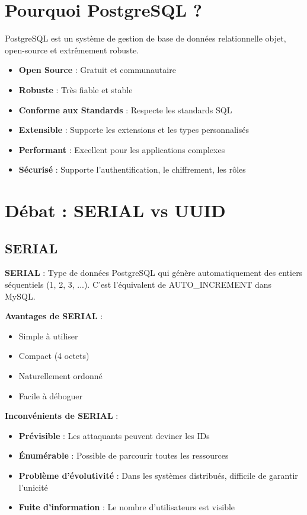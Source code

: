 \section{Pourquoi PostgreSQL ?}

PostgreSQL est un système de gestion de base de données relationnelle objet, open-source et extrêmement robuste.

\begin{itemize}
    \item \textbf{Open Source} : Gratuit et communautaire
    \item \textbf{Robuste} : Très fiable et stable
    \item \textbf{Conforme aux Standards} : Respecte les standards SQL
    \item \textbf{Extensible} : Supporte les extensions et les types personnalisés
    \item \textbf{Performant} : Excellent pour les applications complexes
    \item \textbf{Sécurisé} : Supporte l'authentification, le chiffrement, les rôles
\end{itemize}

\section{Débat : SERIAL vs UUID}

\subsection{SERIAL}

\begin{definitionbox}
    \textbf{SERIAL} : Type de données PostgreSQL qui génère automatiquement des entiers séquentiels (1, 2, 3, ...). C'est l'équivalent de AUTO\_INCREMENT dans MySQL.
\end{definitionbox}

\textbf{Avantages de SERIAL} :
\begin{itemize}
    \item Simple à utiliser
    \item Compact (4 octets)
    \item Naturellement ordonné
    \item Facile à déboguer
\end{itemize}

\textbf{Inconvénients de SERIAL} :
\begin{itemize}
    \item \textbf{Prévisible} : Les attaquants peuvent deviner les IDs
    \item \textbf{Énumérable} : Possible de parcourir toutes les ressources
    \item \textbf{Problème d'évolutivité} : Dans les systèmes distribués, difficile de garantir l'unicité
    \item \textbf{Fuite d'information} : Le nombre d'utilisateurs est visible
\end{itemize}

